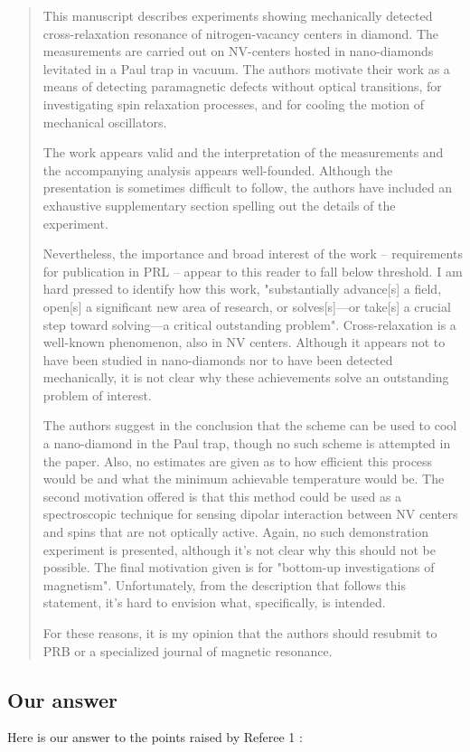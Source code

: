 \documentclass{article}
\begin{document}
\begin{quote}
This manuscript describes experiments showing mechanically detected
cross-relaxation resonance of nitrogen-vacancy centers in diamond. The
measurements are carried out on NV-centers hosted in nano-diamonds
levitated in a Paul trap in vacuum. The authors motivate their work as
a means of detecting paramagnetic defects without optical transitions,
for investigating spin relaxation processes, and for cooling the
motion of mechanical oscillators.

The work appears valid and the interpretation of the measurements and
the accompanying analysis appears well-founded. Although the
presentation is sometimes difficult to follow, the authors have
included an exhaustive supplementary section spelling out the details
of the experiment.

Nevertheless, the importance and broad interest of the work --
requirements for publication in PRL -- appear to this reader to fall
below threshold. I am hard pressed to identify how this work,
"substantially advance[s] a field, open[s] a significant new area of
research, or solves[s]—or take[s] a crucial step toward solving—a
critical outstanding problem". Cross-relaxation is a well-known
phenomenon, also in NV centers. Although it appears not to have been
studied in nano-diamonds nor to have been detected mechanically, it is
not clear why these achievements solve an outstanding problem of
interest.

The authors suggest in the conclusion that the scheme can be used to
cool a nano-diamond in the Paul trap, though no such scheme is
attempted in the paper. Also, no estimates are given as to how
efficient this process would be and what the minimum achievable
temperature would be. The second motivation offered is that this
method could be used as a spectroscopic technique for sensing dipolar
interaction between NV centers and spins that are not optically
active. Again, no such demonstration experiment is presented, although
it's not clear why this should not be possible. The final motivation
given is for "bottom-up investigations of magnetism". Unfortunately,
from the description that follows this statement, it's hard to
envision what, specifically, is intended.

For these reasons, it is my opinion that the authors should resubmit
to PRB or a specialized journal of magnetic resonance.
\end{quote}

\subsection*{Our answer}
Here is our answer to the points raised by Referee 1 :
\end{document}
